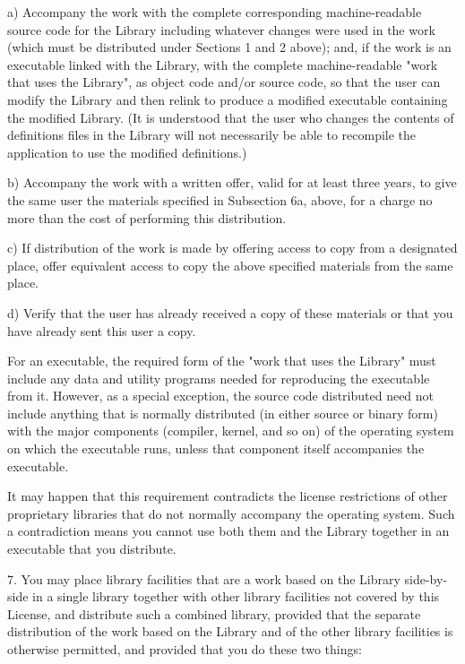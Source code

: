 \documentclass[a4paper,twoside]{tceusermanual}
\begin{document}
    a) Accompany the work with the complete corresponding
    machine-readable source code for the Library including whatever
    changes were used in the work (which must be distributed under
    Sections 1 and 2 above); and, if the work is an executable linked
    with the Library, with the complete machine-readable "work that
    uses the Library", as object code and/or source code, so that the
    user can modify the Library and then relink to produce a modified
    executable containing the modified Library.  (It is understood
    that the user who changes the contents of definitions files in the
    Library will not necessarily be able to recompile the application
    to use the modified definitions.)

    b) Accompany the work with a written offer, valid for at
    least three years, to give the same user the materials
    specified in Subsection 6a, above, for a charge no more
    than the cost of performing this distribution.

    c) If distribution of the work is made by offering access to copy
    from a designated place, offer equivalent access to copy the above
    specified materials from the same place.

    d) Verify that the user has already received a copy of these
    materials or that you have already sent this user a copy.

For an executable, the required form of the "work that uses the
Library" must include any data and utility programs needed for
reproducing the executable from it.  However, as a special
exception, the source code distributed need not include anything
that is normally distributed (in either source or binary form)
with the major components (compiler, kernel, and so on) of the
operating system on which the executable runs, unless that
component itself accompanies the executable.

It may happen that this requirement contradicts the license
restrictions of other proprietary libraries that do not normally
accompany the operating system.  Such a contradiction means you
cannot use both them and the Library together in an executable
that you distribute.
 
7. You may place library facilities that are a work based on the
Library side-by-side in a single library together with other
library facilities not covered by this License, and distribute
such a combined library, provided that the separate distribution
of the work based on the Library and of the other library
facilities is otherwise permitted, and provided that you do
these two things:
\end{document}
